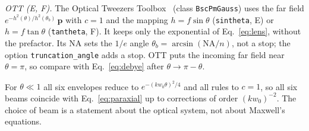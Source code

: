 \documentclass[
	aps,
	pra,
	reprint,
	amsmath,
	amssymb,
	superscriptaddress,
	nofootinbib
]{revtex4-2}
\begin{document}
\emph{OTT (E, F).} The Optical Tweezers Toolbox~\cite{Nieminen2007,Lenton2020OTT} (class \texttt{BscPmGauss}) uses the far field $e^{-h^2(\theta)/h^2(\theta_b)}\,\mathbf p$ with $c=1$ and the mapping $h=f\sin\theta$ (\texttt{sintheta}, E) or $h=f\tan\theta$ (\texttt{tantheta}, F). It keeps only the exponential of Eq.~\eqref{eq:lens}, without the prefactor. Its NA sets the $1/e$ angle $\theta_b=\arcsin(\mathrm{NA}/n)$, not a stop; the option \texttt{truncation\_angle} adds a stop. OTT puts the incoming far field near $\theta=\pi$, so compare with Eq.~\eqref{eq:debye} after $\theta\to\pi-\theta$.

For $\theta\ll1$ all six envelopes reduce to $e^{-(kw_0\theta)^2/4}$ and all rules to $c=1$, so all six beams coincide with Eq.~\eqref{eq:paraxial} up to corrections of order $(kw_0)^{-2}$. The choice of beam is a statement about the optical system, not about Maxwell's equations.


\end{document}
